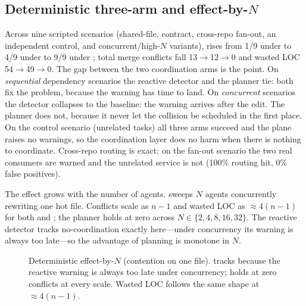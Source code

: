 \subsection{Deterministic three-arm and effect-by-$N$}

Across nine scripted scenarios (shared-file, contract, cross-repo fan-out, an independent control,
and concurrent/high-$N$ variants), \ctsr{} rises from 1/9 under  to 4/9 under
 to 9/9 under ; total merge conflicts fall 13$\rightarrow$12$\rightarrow$0
and wasted LOC 54$\rightarrow$49$\rightarrow$0. The
gap between the two coordination arms is the point. On \emph{sequential} dependency scenarios the
reactive detector and the planner tie: both fix the problem, because the warning has time to
land. On \emph{concurrent} scenarios the detector collapses to the  baseline: the warning
arrives after the edit. The planner does not, because it never let the collision be scheduled in
the first place. On the control scenario (unrelated tasks) all three arms succeed and the plane
raises no warnings, so the coordination layer does no harm when there is nothing to coordinate.
Cross-repo routing is exact: on the fan-out scenario the two real consumers are warned and the
unrelated service is not (100\% routing hit, 0\% false positives).

The effect grows with the number of agents.  sweeps $N$ agents concurrently rewriting
one hot file. Conflicts scale as $n{-}1$ and wasted LOC as $\approx 4(n{-}1)$ for both  and
; the planner holds at zero across $N\in\{2,4,8,16,32\}$. The reactive detector
tracks no-coordination exactly here---under concurrency its warning is always too late---so the
advantage of planning is monotone in $N$.

\begin{figure}[t]
\centering
{}
\caption{Deterministic effect-by-$N$ (contention on one file).  tracks 
because the reactive warning is always too late under concurrency;  holds at zero
conflicts at every scale. Wasted LOC follows the same shape at $\approx 4(n{-}1)$.}
\label{fig:byn}
\end{figure}

